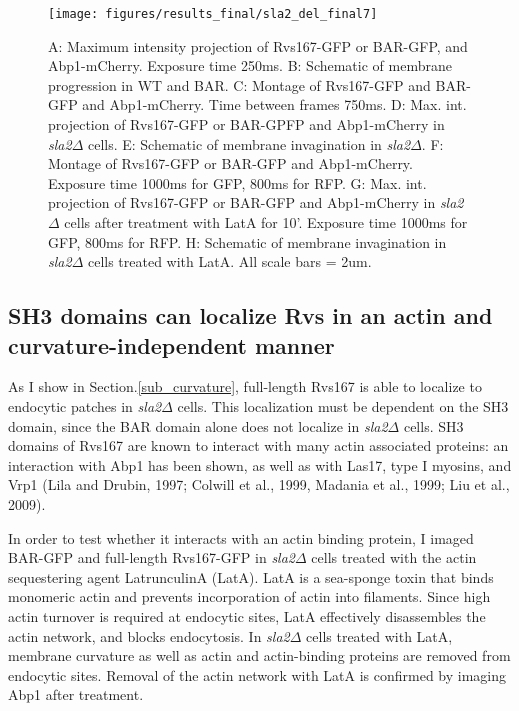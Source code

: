 
 
	\begin{figure}[H]
	\centering
	\texttt{[image: figures/results\_final/sla2\_del\_final7]}
	\caption [Localization of the Rvs167 BAR domain]
{A: Maximum intensity projection of Rvs167-GFP or BAR-GFP, and Abp1-mCherry. Exposure time 250ms. B: Schematic of membrane progression in WT and BAR.
C: Montage of Rvs167-GFP and BAR-GFP and Abp1-mCherry. Time between frames 750ms.
D: Max. int. projection of Rvs167-GFP or BAR-GPFP and Abp1-mCherry in \textit{sla2$\Delta$} cells. 
E: Schematic of membrane invagination in  \textit{sla2$\Delta$}. F: Montage of Rvs167-GFP or BAR-GFP and Abp1-mCherry. Exposure time 1000ms for GFP, 800ms for RFP. 
G: Max. int. projection of Rvs167-GFP or BAR-GFP and Abp1-mCherry in \textit{sla2$\Delta$} cells after treatment with LatA for 10’. Exposure time 1000ms for GFP, 800ms for RFP. H: Schematic of membrane invagination in \textit{sla2$\Delta$} cells treated with LatA. 
All scale bars = 2um.
	\label{fig2_sla2del}}
	\end{figure}

	\vspace{5mm}


	\subsection{SH3 domains can localize Rvs in an actin and curvature-independent manner}
	\label{sec_delsh3_latA}
As I show in Section.\ref{sub_curvature}, full-length Rvs167 is able to localize to endocytic patches in \textit{sla2$\Delta$} cells. This localization must be dependent on the SH3 domain, since the BAR domain alone does not localize in \textit{sla2$\Delta$} cells. SH3 domains of Rvs167 are known to interact with many actin associated proteins: an interaction with Abp1 has been shown, as well as with Las17, type I myosins, and Vrp1 (Lila and Drubin, 1997; Colwill et al., 1999, Madania et al., 1999; Liu et al., 2009). 

	\vspace{5mm}
	
In order to test whether it interacts with an actin binding protein, I imaged BAR-GFP and full-length Rvs167-GFP in \textit{sla2$\Delta$} cells treated with the actin sequestering agent LatrunculinA (LatA). LatA is a sea-sponge toxin that binds monomeric actin and prevents incorporation of actin into filaments. Since high actin turnover is required at endocytic sites, LatA effectively disassembles the actin network, and blocks endocytosis. In \textit{sla2$\Delta$} cells treated with LatA, membrane curvature as well as actin and actin-binding proteins are removed from endocytic sites. Removal of the actin network with LatA is confirmed by imaging Abp1 after treatment.

